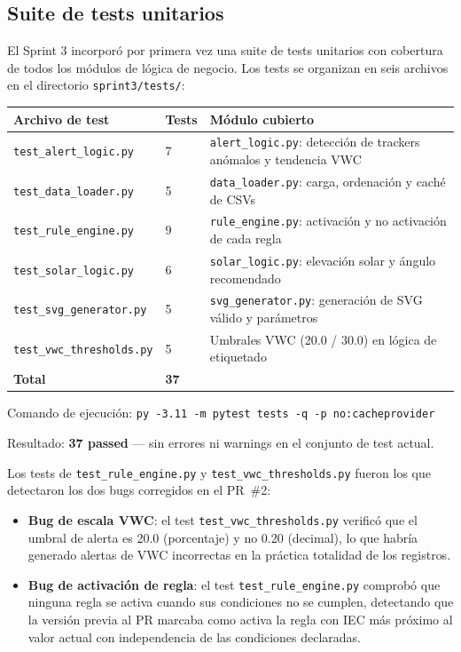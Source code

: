 \documentclass[11pt,a4paper]{article}
\begin{document}
\subsection{Suite de tests unitarios}

El Sprint 3 incorporó por primera vez una suite de tests unitarios con cobertura de todos
los módulos de lógica de negocio. Los tests se organizan en seis archivos en el directorio
\texttt{sprint3/tests/}:

\begin{longtable}{p{} p{} p{}}
\toprule
\textbf{Archivo de test} & \textbf{Tests} & \textbf{Módulo cubierto} \\
\midrule
\texttt{test\_alert\_logic.py}    & 7  & \texttt{alert\_logic.py}: detección de trackers anómalos y tendencia VWC \\
\texttt{test\_data\_loader.py}    & 5  & \texttt{data\_loader.py}: carga, ordenación y caché de CSVs \\
\texttt{test\_rule\_engine.py}    & 9  & \texttt{rule\_engine.py}: activación y no activación de cada regla \\
\texttt{test\_solar\_logic.py}    & 6  & \texttt{solar\_logic.py}: elevación solar y ángulo recomendado \\
\texttt{test\_svg\_generator.py}  & 5  & \texttt{svg\_generator.py}: generación de SVG válido y parámetros \\
\texttt{test\_vwc\_thresholds.py} & 5  & Umbrales VWC (20.0 / 30.0) en lógica de etiquetado \\
\midrule
\textbf{Total} & \textbf{37} & \\
\bottomrule
\end{longtable}

Comando de ejecución: \texttt{py -3.11 -m pytest tests -q -p no:cacheprovider}

Resultado: \textbf{37 passed} — sin errores ni warnings en el conjunto de test actual.

Los tests de \texttt{test\_rule\_engine.py} y \texttt{test\_vwc\_thresholds.py} fueron los que
detectaron los dos bugs corregidos en el PR~\#2:

\begin{itemize}
  \item \textbf{Bug de escala VWC}: el test \texttt{test\_vwc\_thresholds.py} verificó que el
    umbral de alerta es 20.0 (porcentaje) y no 0.20 (decimal), lo que habría generado alertas
    de VWC incorrectas en la práctica totalidad de los registros.
  \item \textbf{Bug de activación de regla}: el test \texttt{test\_rule\_engine.py} comprobó que
    ninguna regla se activa cuando sus condiciones no se cumplen, detectando que la versión
    previa al PR marcaba como activa la regla con IEC más próximo al valor actual con
    independencia de las condiciones declaradas.
\end{itemize}
\end{document}
